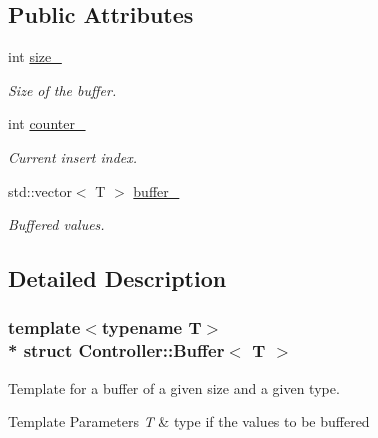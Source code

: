\subsection*{Public Attributes}
\begin{DoxyCompactItemize}
\item 
int \hyperlink{structController_1_1Buffer_a51dd1dc69f114ea7d8585b8f57c3afe1}{size\+\_\+}\hypertarget{structController_1_1Buffer_a51dd1dc69f114ea7d8585b8f57c3afe1}{}\label{structController_1_1Buffer_a51dd1dc69f114ea7d8585b8f57c3afe1}

\begin{DoxyCompactList}\small\item\em Size of the buffer. \end{DoxyCompactList}\item 
int \hyperlink{structController_1_1Buffer_a66c08bfde369f73ce78e85967bd25e6a}{counter\+\_\+}\hypertarget{structController_1_1Buffer_a66c08bfde369f73ce78e85967bd25e6a}{}\label{structController_1_1Buffer_a66c08bfde369f73ce78e85967bd25e6a}

\begin{DoxyCompactList}\small\item\em Current insert index. \end{DoxyCompactList}\item 
std\+::vector$<$ T $>$ \hyperlink{structController_1_1Buffer_aea2f98d896048118af7014893198ddd6}{buffer\+\_\+}\hypertarget{structController_1_1Buffer_aea2f98d896048118af7014893198ddd6}{}\label{structController_1_1Buffer_aea2f98d896048118af7014893198ddd6}

\begin{DoxyCompactList}\small\item\em Buffered values. \end{DoxyCompactList}\end{DoxyCompactItemize}


\subsection{Detailed Description}
\subsubsection*{template$<$typename T$>$\\*
struct Controller\+::\+Buffer$<$ T $>$}

Template for a buffer of a given size and a given type. 


\begin{DoxyTemplParams}{Template Parameters}
{\em T} & type if the values to be buffered \\
\hline
\end{DoxyTemplParams}


